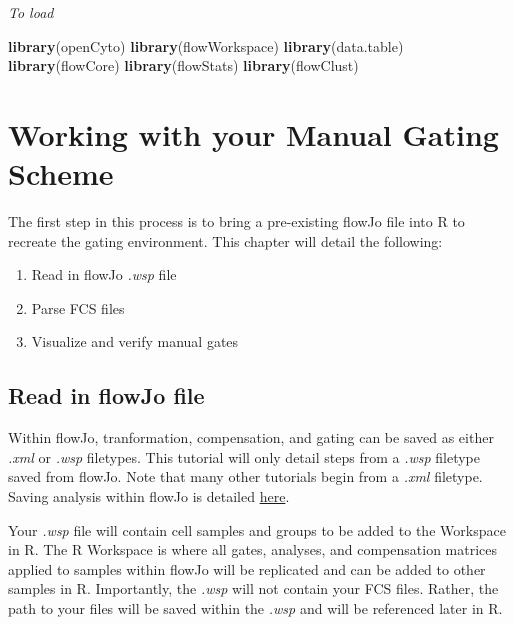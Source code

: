 \documentclass[]{book}
\newenvironment{Shaded}{\begin{snugshade}}{\end{snugshade}}
\newcommand{\KeywordTok}[1]{\textcolor[rgb]{0.13,0.29,0.53}{\textbf{#1}}}
\newcommand{\NormalTok}[1]{#1}
\providecommand{\tightlist}{%
  \setlength{\itemsep}{0pt}\setlength{\parskip}{0pt}}
\begin{document}
\emph{To load}

\begin{Shaded}
\begin{Highlighting}[]
\KeywordTok{library}\NormalTok{(openCyto)}
\KeywordTok{library}\NormalTok{(flowWorkspace)}
\KeywordTok{library}\NormalTok{(data.table)}
\KeywordTok{library}\NormalTok{(flowCore)}
\KeywordTok{library}\NormalTok{(flowStats)}
\KeywordTok{library}\NormalTok{(flowClust)}
\end{Highlighting}
\end{Shaded}

\hypertarget{working-with-your-manual-gating-scheme}{%
\chapter{Working with your Manual Gating Scheme}\label{working-with-your-manual-gating-scheme}}

The first step in this process is to bring a pre-existing flowJo file into R to recreate the gating environment. This chapter will detail the following:

\begin{enumerate}
\def\labelenumi{\arabic{enumi}.}
\tightlist
\item
  Read in flowJo \emph{.wsp} file\\
\item
  Parse FCS files\\
\item
  Visualize and verify manual gates
\end{enumerate}

\hypertarget{read-in-flowjo-file}{%
\section{Read in flowJo file}\label{read-in-flowjo-file}}

Within flowJo, tranformation, compensation, and gating can be saved as either \emph{.xml} or \emph{.wsp} filetypes. This tutorial will only detail steps from a \emph{.wsp} filetype saved from flowJo. Note that many other tutorials begin from a \emph{.xml} filetype. Saving analysis within flowJo is detailed \href{http://docs.flowjo.com/vx/workspaces-and-samples/ws-savinganalysis/}{here}.

Your \emph{.wsp} file will contain cell samples and groups to be added to the Workspace in R. The R Workspace is where all gates, analyses, and compensation matrices applied to samples within flowJo will be replicated and can be added to other samples in R. Importantly, the \emph{.wsp} will not contain your FCS files. Rather, the path to your files will be saved within the \emph{.wsp} and will be referenced later in R.
\end{document}
